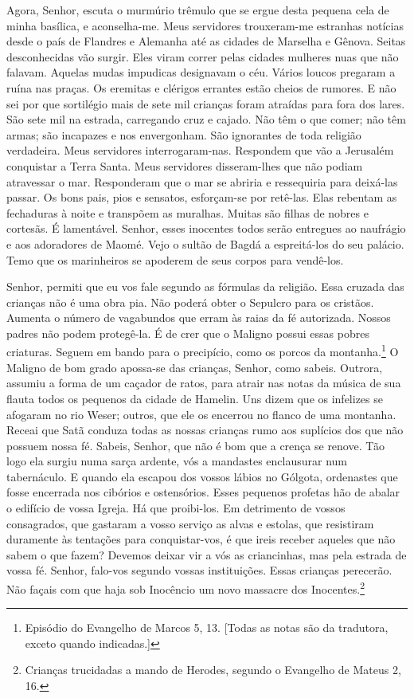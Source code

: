 Agora, Senhor, escuta o murmúrio trêmulo que se ergue desta pequena cela de
minha basílica, e aconselha-me. Meus servidores trouxeram-me estranhas
notícias desde o país de Flandres e Alemanha até as cidades de Marselha e
Gênova. Seitas desconhecidas vão surgir. Eles viram correr pelas cidades
mulheres nuas que não falavam. Aquelas mudas impudicas designavam o céu.
Vários loucos pregaram a ruína nas praças. Os eremitas e clérigos errantes
estão cheios de rumores. E não sei por que sortilégio mais de sete mil
crianças foram atraídas para fora dos lares. São sete mil na estrada,
carregando cruz e cajado. Não têm o que comer; não têm armas; são
incapazes e nos envergonham. São ignorantes de toda religião verdadeira.
Meus servidores interrogaram-nas. Respondem que vão a Jerusalém conquistar
a Terra Santa. Meus servidores disseram-lhes que não podiam atravessar o
mar. Responderam que o mar se abriria e ressequiria para deixá-las passar.
Os bons pais, pios e sensatos, esforçam-se por retê-las. Elas rebentam as
fechaduras à noite e transpõem as muralhas. Muitas são filhas de nobres e
cortesãs. É lamentável. Senhor, esses inocentes todos serão entregues ao
naufrágio e aos adoradores de Maomé. Vejo o sultão de Bagdá a espreitá-los
do seu palácio. Temo que os marinheiros se apoderem de seus corpos para
vendê-los.

Senhor, permiti que eu vos fale segundo as fórmulas da religião. Essa
cruzada das crianças não é uma obra pia. Não poderá obter o Sepulcro para
os cristãos. Aumenta o número de vagabundos que erram às raias da fé
autorizada. Nossos padres não podem protegê-la. É de crer que o Maligno
possui essas pobres criaturas. Seguem em bando para o precipício, como os
porcos da montanha.\footnote{ Episódio do Evangelho de Marcos 5, 13. 
[Todas as notas são da tradutora, exceto quando indicadas.]} O
Maligno de bom grado apossa-se das crianças, Senhor, como sabeis. Outrora,
assumiu a forma de um caçador de ratos, para atrair nas notas da música de
sua flauta todos os pequenos da cidade de Hamelin. Uns dizem que os
infelizes se afogaram no rio Weser; outros, que ele os encerrou no flanco
de uma montanha. Receai que Satã conduza todas as nossas crianças rumo aos
suplícios dos que não possuem nossa fé. Sabeis, Senhor, que não é bom que
a crença se renove. Tão logo ela surgiu numa sarça ardente, vós a
mandastes enclausurar num tabernáculo. E quando ela escapou dos vossos
lábios no Gólgota, ordenastes que fosse encerrada nos cibórios e
ostensórios. Esses pequenos profetas hão de abalar o edifício de vossa
Igreja. Há que proibi-los. Em detrimento de vossos consagrados, que
gastaram a vosso serviço as alvas e estolas, que resistiram duramente às
tentações para conquistar-vos, é que ireis receber aqueles que não sabem o
que fazem? Devemos deixar vir a vós as criancinhas, mas pela estrada de
vossa fé. Senhor, falo-vos segundo vossas instituições. Essas crianças
perecerão. Não façais com que haja sob Inocêncio um novo massacre dos
Inocentes.\footnote{ Crianças trucidadas a mando de Herodes, segundo o
Evangelho de Mateus 2, 16.}

